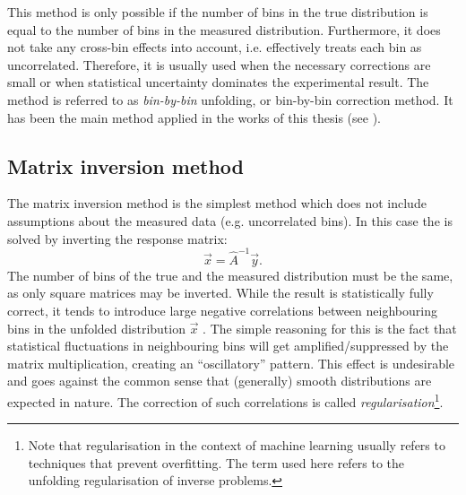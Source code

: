 This method is only possible if the number of bins in the true distribution is equal to the number of bins in the measured distribution.
Furthermore, it does not take any cross-bin effects into account, i.e. effectively treats each bin as uncorrelated.
Therefore, it is usually used when the necessary corrections are small or when statistical uncertainty dominates the experimental result.
The method is referred to as \textit{bin-by-bin} unfolding, or bin-by-bin correction method.
It has been the main method applied in the works of this thesis (see ).

\subsection{Matrix inversion method}
The matrix inversion method is the simplest method which does not include assumptions about the measured data (e.g. uncorrelated bins).
In this case the  is solved by inverting the response matrix:
\begin{equation}
    \vec{x} = \hat{A}^{-1}\vec{y}.
\end{equation}
The number of bins of the true and the measured distribution must be the same, as only square matrices may be inverted.
While the result is statistically fully correct, it tends to introduce large negative correlations between neighbouring bins in the unfolded distribution $\vec{x}$ \cite{Schmitt:2016orm}.
The simple reasoning for this is the fact that statistical fluctuations in neighbouring bins will get amplified/suppressed by the matrix multiplication, creating an ``oscillatory'' pattern.
This effect is undesirable and goes against the common sense that (generally) smooth distributions are expected in nature.
The correction of such correlations is called \textit{regularisation}\footnote{Note that regularisation in the context of machine learning usually refers to techniques that prevent overfitting.
The term used here refers to the unfolding regularisation of inverse problems.
}.

